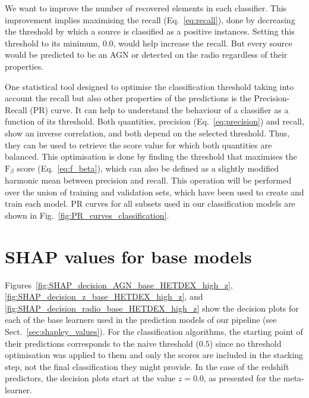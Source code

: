 \documentclass{aa}
\begin{document}
\begin{appendix}
We want to improve the number of recovered elements in each classifier. This improvement implies maximising the recall (Eq.~\ref{eq:recall}), done by decreasing the threshold by which a source is classified as a positive instances. Setting this threshold to its minimum, $0.0$, would help increase the recall. But every source would be predicted to be an AGN or detected on the radio regardless of their properties.%

One statistical tool designed to optimise the classification threshold taking into account the recall but also other properties of the predictions is the Precision-Recall (PR) curve. It can help to understand the behaviour of a classifier as a function of its threshold. Both quantities, precision (Eq.~\ref{eq:precision}) and recall, show an inverse correlation, and both depend on the selected threshold. Thus, they can be used to retrieve the score value for which both quantities are balanced. This optimisation is done by finding the threshold that maximises the $\mathrm{F}_{\beta}$ score (Eq.~\ref{eq:f_beta}), which can also be defined as a slightly modified harmonic mean between precision and recall. This operation will be performed over the union of training and validation sets, which have been used to create and train each model. PR curves for all subsets used in our classification models are shown in Fig.~\ref{fig:PR_curves_classification}.

\section{SHAP values for base models}\label{sec:app_shap_base}

Figures~\ref{fig:SHAP_decision_AGN_base_HETDEX_high_z}, \ref{fig:SHAP_decision_z_base_HETDEX_high_z}, and \ref{fig:SHAP_decision_radio_base_HETDEX_high_z} show the decision plots for each of the base learners used in the prediction models of our pipeline (see Sect.~\ref{sec:shapley_values}). For the classification algorithms, the starting point of their predictions corresponds to the naive threshold ($0.5$) since no threshold optimisation was applied to them and only the scores are included in the stacking step, not the final classification they might provide. In the case of the redshift predictors, the decision plots start at the value $z = 0.0$, as presented for the meta-learner.


\end{appendix}
\end{document}
